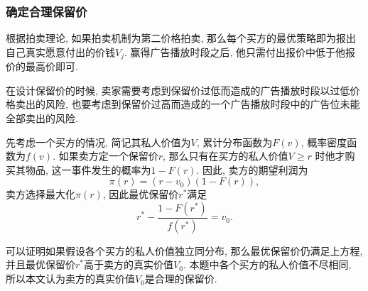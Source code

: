 \subsubsection{确定合理保留价}

根据拍卖理论, 如果拍卖机制为第二价格拍卖, 那么每个买方的最优策略即为报出
自己真实愿意付出的价钱$V_{j}$. 赢得广告播放时段之后,
他只需付出报价中低于他报价的最高价即可.

在设计保留价的时候, 卖家需要考虑到保留价过低而造成的广告播放时段以过低价格卖出的风险,
也要考虑到保留价过高而造成的一个广告播放时段中的广告位未能全部卖出的风险.

先考虑一个买方的情况, 简记其私人价值为$V$, 累计分布函数为$F(v)$,
概率密度函数为$f(v)$.
如果卖方定一个保留价$r$, 那么只有在买方的私人价值$V\geq r$
时他才购买其物品, 这一事件发生的概率为$1-F(r)$. 因此, 卖方的期望利润为
\begin{equation}
    \pi(r) = (r-v_{0})(1-F(r)),
\end{equation}
卖方选择最大化$\pi(r)$, 因此最优保留价$r^{*}$满足
\begin{equation}
    r^{*}-\frac{1-F(r^{*})}{f(r^{*})} = v_{0}.
\end{equation}

可以证明如果假设各个买方的私人价值独立同分布,
那么最优保留价仍满足上方程, 并且最优保留价$r^{*}$高于卖方的真实价值$V_{0}$.
本题中各个买方的私人价值不尽相同, 所以本文认为卖方的真实价值$V_{0}$是合理的保留价.

